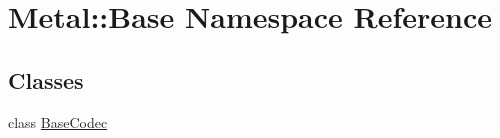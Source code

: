 \hypertarget{namespaceMetal_1_1Base}{}\section{Metal\+:\+:Base Namespace Reference}
\label{namespaceMetal_1_1Base}
\subsection*{Classes}
\begin{DoxyCompactItemize}
\item 
class \hyperlink{classMetal_1_1Base_1_1BaseCodec}{Base\+Codec}
\end{DoxyCompactItemize}
